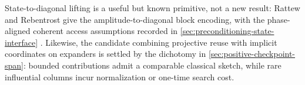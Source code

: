 State-to-diagonal lifting is a useful but known primitive, not a new result:
Rattew and Rebentrost give the amplitude-to-diagonal block encoding, with the
phase-aligned coherent access assumptions recorded in
\cref{sec:preconditioning-state-interface}
\cite{rattew2023-non-linear-transformations-of-quantum}.  Likewise, the
candidate combining projective reuse with implicit coordinates on expanders
is settled by the dichotomy in
\cref{sec:positive-checkpoint-span}: bounded contributions admit a comparable
classical sketch, while rare influential columns incur normalization or
one-time search cost.
